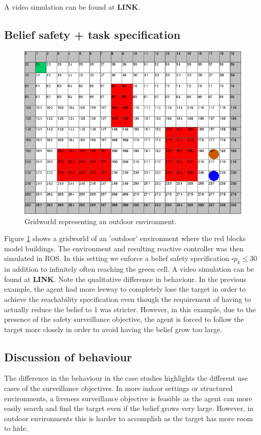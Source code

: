  A video simulation can be found at \textbf{LINK}. 

\subsection{Belief safety + task specification}
\begin{figure}
\centering
\includegraphics[scale=0.3]{case2.png}\caption{Gridworld representing an outdoor environment.}\label{fig:case2}
\end{figure}
Figure \ref{fig:case2} shows a gridworld of an 'outdoor' environment where the red blocks model buildings. The environment and resulting reactive controller was then simulated in ROS.
In this setting we enforce a belief safety specification $\square p_k \leq 30$ in addition to infinitely often reaching the green cell.  A video simulation can be found at \textbf{LINK}. Note the qualitative difference in behaviour. In the previous example, the agent had more leeway to completely lose the target in order to achieve the reachability specification even though the requirement of having to actually reduce the belief to 1 was stricter. However, in this example, due to the presence of the safety surveillance objective, the agent is forced to follow the target more closely in order to avoid having the belief grow too large. 

\subsection{Discussion of behaviour}
The difference in the behaviour in the case studies highlights the different use cases of the surveillance objectives. In more indoor settings or structured environments, a liveness surveillance objective is feasible as the agent can more easily search and find the target even if the belief grows very large. However, in outdoor environments this is harder to accomplish as the target has more room to hide. 